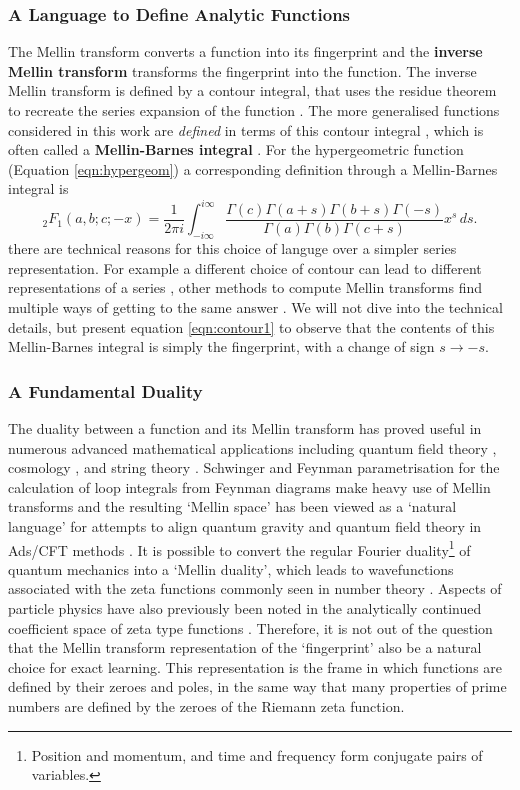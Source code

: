 \documentclass{article}
\begin{document}
\subsubsection{A Language to Define Analytic Functions}
The Mellin transform converts a function into its fingerprint and the \textbf{inverse Mellin transform} transforms the fingerprint into the function. The inverse Mellin transform is defined by a contour integral, that uses the residue theorem to recreate the series expansion of the function \cite{Fikioris2006,Mainardi2003}. The more generalised functions considered in this work are \emph{defined} in terms of this contour integral \cite{Rathie1997,Rathie2013,Rathie2018}, which is often called a \textbf{Mellin-Barnes integral} \cite{Mainardi2003}. For the hypergeometric function (Equation \ref{eqn:hypergeom}) a corresponding definition through a Mellin-Barnes integral is
\begin{equation}
_2F_1(a,b;c;-x) =\frac{1}{2\pi i} \int_{-i\infty}^{i\infty} \frac{\Gamma(c)\Gamma(a+s)\Gamma(b+s)\Gamma(-s)}{\Gamma(a)\Gamma(b)\Gamma(c+s)}x^s\,ds.
\label{eqn:contour1}
\end{equation}
there are technical reasons for this choice of languge over a simpler series representation. For example a different choice of contour can lead to different representations of a series \cite{Rathie1997}, other methods to compute Mellin transforms find multiple ways of getting to the same answer \cite{Gonzalez2015}. We will not dive into the technical details, but present equation \ref{eqn:contour1} to observe that the contents of this Mellin-Barnes integral is simply the fingerprint, with a change of sign $s \to -s$. 

\subsubsection{A Fundamental Duality}
The duality between a function and its Mellin transform has proved useful in numerous advanced mathematical applications including quantum field theory \cite{Gonzalez2015}, cosmology \cite{Sleight2020}, and string theory \cite{Passare1996}. Schwinger and Feynman parametrisation for the calculation of loop integrals from Feynman diagrams make heavy use of Mellin transforms \cite{Sameshima2019} and the resulting `Mellin space' has been viewed as a `natural language' for attempts to align quantum gravity and quantum field theory in Ads/CFT methods \cite{Fitzpatrick2011}. It is possible to convert the regular Fourier duality\footnote{Position and momentum, and time and frequency form conjugate pairs of variables.} of quantum mechanics into a `Mellin duality', which leads to wavefunctions associated with the zeta functions commonly seen in number theory \cite{Twamley2006}. Aspects of particle physics have also previously been noted in the analytically continued coefficient space of zeta type functions \cite{Woon1997}. Therefore, it is not out of the question that the Mellin transform representation of the `fingerprint' also be a natural choice for exact learning. This representation is the frame in which functions are defined by their zeroes and poles, in the same way that many properties of prime numbers are defined by the zeroes of the Riemann zeta function. \\
\end{document}
